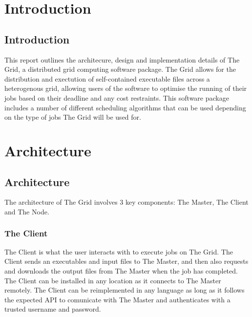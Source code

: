 
\def\mytitle{Project Report}
\def\myauthor{Adam Whiteside \& Scott Richie \& Andrew Vadnal \& Terence Siganakis}
\def\mydate{2012-05-31}
\def\latexmode{memoir}

\part{Introduction}
\label{introduction}

\chapter{Introduction}
\label{introduction}

This report outlines the architecure, design and implementation details of The Grid, a distributed grid computing software package. The Grid allows for the distribution and exectution of self-contained executable files across a heterogenous grid, allowing users of the software to optimise the running of their jobs based on their deadline and any cost restraints. This software package includes a number of different scheduling algorithms that can be used depending on the type of jobs The Grid will be used for.

\part{Architecture}
\label{architecture}

\chapter{Architecture}
\label{architecture}

The architecture of The Grid involves 3 key components: The Master, The Client and The Node.

\section{The Client}
\label{theclient}

The Client is what the user interacts with to execute jobs on The Grid. The Client sends an executables and input files to The Master, and then also requests and downloads the output files from The Master when the job has completed. The Client can be installed in any location as it connects to The Master remotely. The Client can be reimplemented in any language as long as it follows the expected API to comunicate with The Master and authenticates with a trusted username and password.

